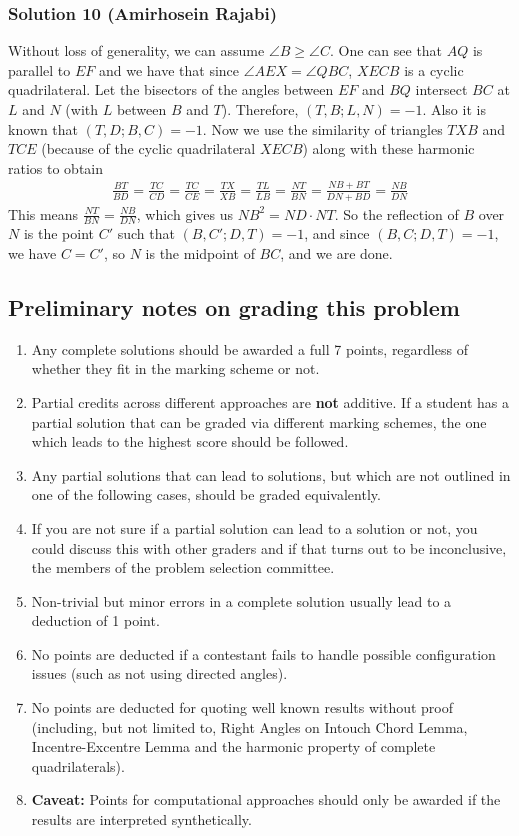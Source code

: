 \subsubsection{Solution 10 (Amirhosein Rajabi)}
Without loss of generality, we can assume $\angle B \ge \angle C$. One can see that $AQ$ is parallel to $EF$ and we have that since $\angle AEX = \angle QBC$, $XECB$ is a cyclic quadrilateral. Let the bisectors of the angles between $EF$ and $BQ$ intersect $BC$ at $L$ and $N$ (with $L$ between $B$ and $T$). Therefore, $(T, B; L, N) = -1$. Also it is known that $(T, D; B, C) = -1$. Now we use the similarity of triangles $TXB$ and $TCE$ (because of the cyclic quadrilateral $XECB$) along with these harmonic ratios to obtain
\begin{align*}
    \frac{BT}{BD} = \frac{TC}{CD}
    = \frac{TC}{CE}
    = \frac{TX}{XB}
    = \frac{TL}{LB}
    = \frac{NT}{BN}
    = \frac{NB + BT}{DN + BD}
    = \frac{NB}{DN}
\end{align*}
This means $\frac{NT}{BN} = \frac{NB}{DN}$, which gives us $NB^2 = ND \cdot NT$. So the reflection of $B$ over $N$ is the point $C'$ such that $(B, C'; D, T) = -1$, and since $(B, C; D, T) = -1$, we have $C = C'$, so $N$ is the midpoint of $BC$, and we are done.
\subsection{Preliminary notes on grading this problem}
\begin{enumerate}
    \item Any complete solutions should be awarded a full 7 points, regardless of whether they fit in the marking scheme or not.
    \item Partial credits across different approaches are \textbf{not} additive. If a student has a partial solution that can be graded via different marking schemes, the one which leads to the highest score should be followed.
    \item Any partial solutions that can lead to solutions, but which are not outlined in one of the following cases, should be graded equivalently.
    \item If you are not sure if a partial solution can lead to a solution or not, you could discuss this with other graders and if that turns out to be inconclusive, the members of the problem selection committee.
    \item Non-trivial but minor errors in a complete solution usually lead to a deduction of 1 point.
    \item No points are deducted if a contestant fails to handle possible configuration issues (such as not using directed angles).
    \item No points are deducted for quoting well known results without proof (including, but not limited to, Right Angles on Intouch Chord Lemma, Incentre-Excentre Lemma and the harmonic property of complete quadrilaterals).
    \item \textbf{Caveat:} Points for computational approaches should only be awarded if the results are interpreted synthetically.
\end{enumerate}

